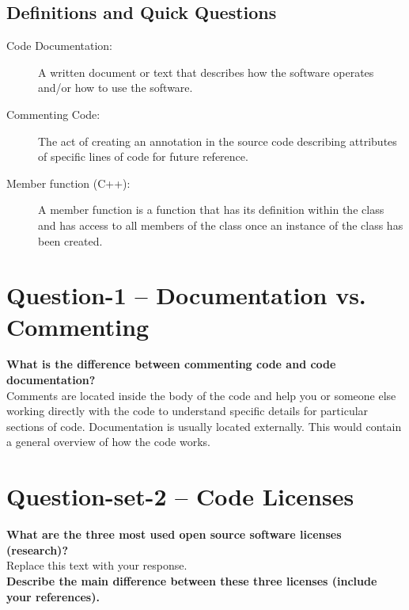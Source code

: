 \documentclass{article}
\begin{document}
\subsection{Definitions and Quick Questions}
\label{definitions}
\begin{description}
\item[Code Documentation:]
A written document or text that describes how the software operates and/or how to use the software.
\item[Commenting Code:]
The act of creating an annotation in the source code describing attributes of specific lines of code for future reference.
\item[Member function (C++):]
A member function is a function that has its definition within the class and has access to all members of the class once an instance of the class has been created.
\end{description} 

\section{Question-1 -- Documentation vs. Commenting}
\textbf{What is the difference between commenting code and code documentation?}\\

Comments are located inside the body of the code and help you or someone else working directly with the code to understand specific details for particular sections of code. Documentation is usually located externally. This would contain a general overview of how the code works. \\

\section{Question-set-2 -- Code Licenses}
\textbf{What are the three most used open source software licenses (research)? }\\

Replace this text with your response. \\

\textbf{Describe the main difference between these three licenses (include your references).}
\end{document}
